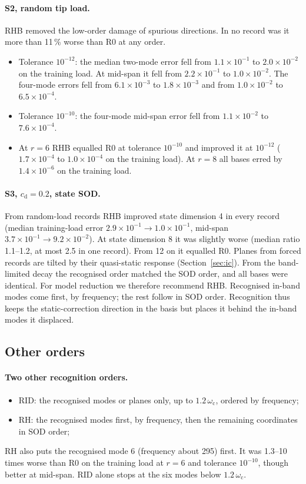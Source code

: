 \documentclass[11pt]{article}
\begin{document}
\paragraph{S2, random tip load.} RHB removed the low-order damage of spurious directions. In no record was it more than 11\,\% worse than R0 at any order.
\begin{itemize}
\item Tolerance $10^{-12}$: the median two-mode error fell from $1.1\times10^{-1}$ to $2.0\times10^{-2}$ on the training load. At mid-span it fell from $2.2\times10^{-1}$ to $1.0\times10^{-2}$. The four-mode errors fell from $6.1\times10^{-3}$ to $1.8\times10^{-3}$ and from $1.0\times10^{-2}$ to $6.5\times10^{-4}$.
\item Tolerance $10^{-10}$: the four-mode mid-span error fell from $1.1\times10^{-2}$ to $7.6\times10^{-4}$.
\item At $r=6$ RHB equalled R0 at tolerance $10^{-10}$ and improved it at $10^{-12}$ ($1.7\times10^{-4}$ to $1.0\times10^{-4}$ on the training load). At $r=8$ all bases erred by $1.4\times10^{-6}$ on the training load.
\end{itemize}
\paragraph{S3, $c_{\mathrm d}=0.2$, state SOD.} From random-load records RHB improved state dimension 4 in every record (median training-load error $2.9\times10^{-1}\to1.0\times10^{-1}$, mid-span $3.7\times10^{-1}\to9.2\times10^{-2}$). At state dimension 8 it was slightly worse (median ratio 1.1--1.2, at most 2.5 in one record). From 12 on it equalled R0. Planes from forced records are tilted by their quasi-static response (Section~\ref{sec:ic}). From the band-limited decay the recognised order matched the SOD order, and all bases were identical.
For model reduction we therefore recommend RHB. Recognised in-band modes come first, by frequency; the rest follow in SOD order.
Recognition thus keeps the static-correction direction in the basis but places it behind the in-band modes it displaced.

\subsection{Other orders}\label{sec:s-recog}
\paragraph{Two other recognition orders.}
\begin{itemize}
\item RID: the recognised modes or planes only, up to $1.2\,\omega_{\mathrm c}$, ordered by frequency;
\item RH: the recognised modes first, by frequency, then the remaining coordinates in SOD order;
\end{itemize}
RH also puts the recognised mode 6 (frequency about 295) first. It was 1.3--10 times worse than R0 on the training load at $r=6$ and tolerance $10^{-10}$, though better at mid-span. RID alone stops at the six modes below $1.2\,\omega_{\mathrm c}$.
\end{document}
